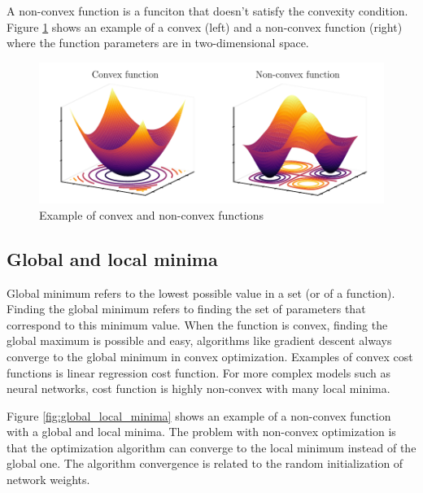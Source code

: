 A non-convex function is a funciton that doesn't satisfy the convexity condition. Figure \ref{fig:convex-nonconvex-functions} shows an example of a convex (left) and a non-convex function (right) where the function parameters are in two-dimensional space.

\begin{figure}[h]
    \centering
    \includegraphics{figures/gradient_descent.pdf}
    \caption{Example of convex and non-convex functions}
    \label{fig:convex-nonconvex-functions}
\end{figure}

\subsection{Global and local minima}
Global minimum refers to the lowest possible value in a set (or of a function). Finding the global minimum refers to finding the set of parameters that correspond to this minimum value. When the function is convex, finding the global maximum is possible and easy, algorithms like gradient descent always converge to the global minimum in convex optimization. Examples of convex cost functions is linear regression cost function. For more complex models such as neural networks, cost function is highly non-convex with many local minima.

Figure \ref{fig:global_local_minima} shows an example of a non-convex function with a global and local minima. The problem with non-convex optimization is that the optimization algorithm can converge to the local minimum instead of the global one. The algorithm convergence is related to the random initialization of network weights.

